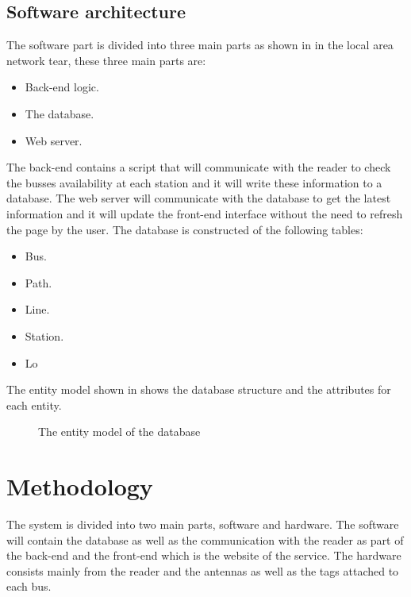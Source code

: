 \documentclass[a4paper,twoside]{article}
\begin{document}
\subsection{Software architecture}
The software part is divided into three main parts as shown in  in the local area network tear, these three main parts are:
\begin{itemize}
\item
Back-end logic.
\item
The database.
\item
Web server.
\end{itemize}
The back-end contains a script that will communicate with the reader to check the busses availability at each station and it will write these information to a database. The web server will communicate with the database to get the latest information and it will update the front-end interface without the need to refresh the page by the user. The database is constructed of the following tables:
\begin{itemize}
\item
Bus.
\item
Path.
\item
Line.
\item
Station.
\item
Lo
\end{itemize}
The entity model shown in  shows the database structure and the attributes for each entity.
\begin{figure}
\centering
{}
\caption{The entity model of the database}
\label{entity}
\end{figure}
\section{Methodology}
The system is divided into two main parts, software and hardware. The software will contain the database as well as the communication with the reader as part of the back-end and the front-end which is the website of the service. The hardware consists mainly from the reader and the antennas as well as the tags attached to each bus.
\end{document}
